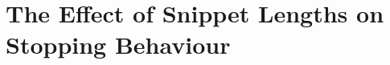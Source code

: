 
\chapter[The Effects of Snippet Lengths on Stopping Behaviour]{The Effect of Snippet Lengths on\\Stopping Behaviour}\label{chap:snippets}